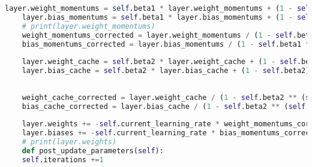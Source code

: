 \begin{lstlisting}[language=Python, caption=Optimizer function]
	layer.weight_momentums = self.beta1 * layer.weight_momentums + (1 - self.beta1) * layer.d_weights
	layer.bias_momentums = self.beta1 * layer.bias_momentums + (1 - self.beta1) * layer.d_biases
	# print(layer.weight_momentums)
	weight_momentums_corrected = layer.weight_momentums / (1 - self.beta1 ** (self.iterations +1))
	bias_momentums_corrected = layer.bias_momentums / (1 - self.beta1 ** (self.iterations +1))
	
	layer.weight_cache = self.beta2 * layer.weight_cache + (1 - self.beta2) * layer.d_weights**2
	layer.bias_cache = self.beta2 * layer.bias_cache + (1 - self.beta2) * layer.d_biases**2
	
	
	weight_cache_corrected = layer.weight_cache / (1 - self.beta2 ** (self.iterations+1))
	bias_cache_corrected = layer.bias_cache / (1 - self.beta2 ** (self.iterations+1))
	
	layer.weights += -self.current_learning_rate * weight_momentums_corrected / (np.sqrt(weight_cache_corrected) + self.epsilon)
	layer.biases += -self.current_learning_rate * bias_momentums_corrected / (np.sqrt(bias_cache_corrected) + self.epsilon)
	# print(layer.weights)
	def post_update_parameters(self):
	self.iterations +=1

\end{lstlisting}	


